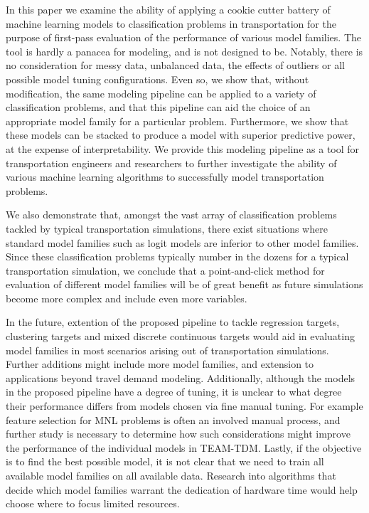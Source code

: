 \documentclass[conference]{IEEEtran}
\begin{document}
In this paper we examine the ability of applying a cookie cutter battery of machine learning models to classification problems in transportation for the purpose of first-pass evaluation of the performance of various model families.
 The tool is hardly a panacea for modeling, and is not designed to be.
 Notably, there is no consideration for messy data, unbalanced data, the effects of outliers or all possible model tuning configurations.
 Even so, we show that, without modification, the same modeling pipeline can be applied to a variety of classification problems, and that this pipeline can aid the choice of an appropriate model family for a particular problem.
 Furthermore, we show that these models can be stacked to produce a model with superior predictive power, at the expense of interpretability.
 We provide this modeling pipeline as a tool for transportation engineers and researchers to further investigate the ability of various machine learning algorithms to successfully model transportation problems.

We also demonstrate that, amongst the vast array of classification problems tackled by typical transportation simulations, there exist situations where standard model families such as logit models are inferior to other model families.
 Since these classification problems typically number in the dozens for a typical transportation simulation, we conclude that a point-and-click method for evaluation of different model families will be of great benefit as future simulations become more complex and include even more variables.

In the future, extention of the proposed pipeline to tackle regression targets, clustering targets and mixed discrete continuous targets would aid in evaluating model families in most scenarios arising out of transportation simulations.
 Further additions might include more model families, and extension to applications beyond travel demand modeling.
 Additionally, although the models in the proposed pipeline have a degree of tuning, it is unclear to what degree their performance differs from models chosen via fine manual tuning.
 For example feature selection for MNL problems is often an involved manual process, and further study is necessary to determine how such considerations might improve the performance of the individual models in TEAM-TDM.
 Lastly, if the objective is to find the best possible model, it is not clear that we need to train all available model families on all available data.
 Research into algorithms that decide which model families warrant the dedication of hardware time would help choose where to focus limited resources.


{}

\end{document}
